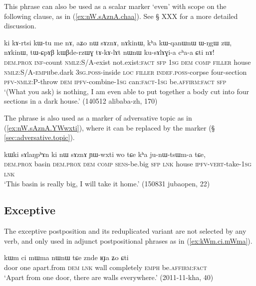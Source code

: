 This phrase can also be used as a scalar marker `even' with scope on the following clause, as in (\ref{ex:nW.sAznA.chaa}). See § XXX for a more detailed discussion. %
 

 \begin{exe}
 \ex \label{ex:nW.sAznA.chaa}
 \gll ki kɤ-rtsi kɯ-tu me nɤ, aʑo nɯ sɤznɤ, nɤkinɯ, kʰa kɯ-qanɯ\redp{}nɯ ɯ-ŋgɯ zɯ, nɤkinɯ, tɯ-ɕpɤβ kɯβde-rzɯɣ tɤ-kɤ-lɤt nɯnɯ ku-sɤlɤɣi-a cʰa-a ɕti nɤ! \\
 \textsc{dem}.\textsc{prox} \textsc{inf}-count \textsc{nmlz}:S/A-exist not.exist:\textsc{fact} \textsc{sfp} \textsc{1sg} \textsc{dem} \textsc{comp} \textsc{filler} house   \textsc{nmlz}:S/A-\textsc{emph}\redp{}be.dark \textsc{3sg}.\textsc{poss}-inside \textsc{loc}  \textsc{filler} \textsc{indef}.\textsc{poss}-corpse four-section \textsc{pfv}-\textsc{nmlz}:P-throw \textsc{dem} \textsc{ipfv}-combine-\textsc{1sg} can:\textsc{fact}-\textsc{1sg} be.\textsc{affirm}:\textsc{fact} \textsc{sfp}  \\
\glt  `(What you ask) is nothing, I am even able to put together a body cut into four sections in a dark house.' (140512 alibaba-zh, 170)
\end{exe}

The phrase  is also used as a marker of adversative topic as in (\ref{ex:nW.sAznA.YWwxti}), where it can be replaced by the marker  (§ \ref{sec:adversative.topic}).

\begin{exe}
\ex \label{ex:nW.sAznA.YWwxti}
\gll kɯki sɤlaŋpʰɤn ki nɯ sɤznɤ ɲɯ-wxti wo tɕe kʰa ju-nɯ-tsɯm-a tɕe, \\
\textsc{dem}.\textsc{prox} basin \textsc{dem}.\textsc{prox}  \textsc{dem} \textsc{comp}  \textsc{sens}-be.big \textsc{sfp} \textsc{lnk} house \textsc{ipfv}-\textsc{vert}-take-\textsc{1sg} \textsc{lnk} \\
\glt `This basin is really big, I will take it home.' (150831 jubaopen, 22)
\end{exe}

\subsection{Exceptive} \label{sec:exceptive} %
The exceptive postposition  and its reduplicated variant  are not selected by any verb, and only used in adjunct postpositional phrases as in (\ref{ex:kWm.ci.mWma}).

 \begin{exe}
 \ex \label{ex:kWm.ci.mWma}
 \gll kɯm ci mɯma nɯnɯ tɕe znde ʁɟa ʑo ɕti \\
 door one apart.from \textsc{dem} \textsc{lnk} wall completely \textsc{emph} be.\textsc{affirm}:\textsc{fact} \\
 \glt `Apart from one door, there are walls everywhere.' (2011-11-kha, 40)
\end{exe}

